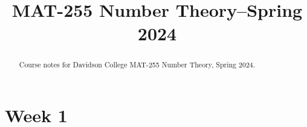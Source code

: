 \documentclass[handout]{xourse}
\title{MAT-255 Number Theory--Spring 2024}
\begin{document}
  
\begin{abstract} %
Course notes for Davidson College MAT-255 Number Theory, Spring 2024.
\end{abstract}  
\maketitle  
 
\part{Week 1}






\end{document}
